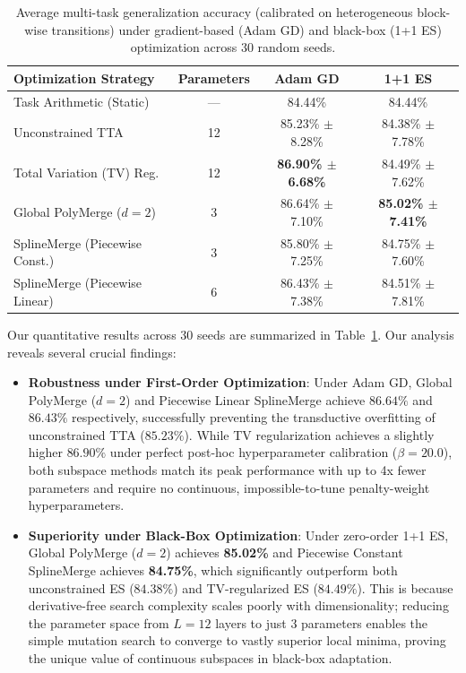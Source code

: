 \begin{table}[t]
\centering
\caption{Average multi-task generalization accuracy (calibrated on heterogeneous block-wise transitions) under gradient-based (Adam GD) and black-box (1+1 ES) optimization across 30 random seeds.}
\label{tab:heterogeneous_results}
\setlength{\tabcolsep}{6pt}
\begin{small}
\begin{tabular}{lccc}
\toprule
\textbf{Optimization Strategy} & \textbf{Parameters} & \textbf{Adam GD} & \textbf{1+1 ES} \\
\midrule
Task Arithmetic (Static) & --- & 84.44\% & 84.44\% \\
Unconstrained TTA & 12 & 85.23\% $\pm$ 8.28\% & 84.38\% $\pm$ 7.78\% \\
Total Variation (TV) Reg. & 12 & \textbf{86.90\% $\pm$ 6.68\%} & 84.49\% $\pm$ 7.62\% \\
\midrule
Global PolyMerge ($d=2$) & 3 & 86.64\% $\pm$ 7.10\% & \textbf{85.02\% $\pm$ 7.41\%} \\
SplineMerge (Piecewise Const.) & 3 & 85.80\% $\pm$ 7.25\% & 84.75\% $\pm$ 7.60\% \\
SplineMerge (Piecewise Linear) & 6 & 86.43\% $\pm$ 7.38\% & 84.51\% $\pm$ 7.81\% \\
\bottomrule
\end{tabular}
\end{small}
\end{table}

Our quantitative results across 30 seeds are summarized in Table~\ref{tab:heterogeneous_results}. Our analysis reveals several crucial findings:
\begin{itemize}
    \item \textbf{Robustness under First-Order Optimization}: Under Adam GD, Global PolyMerge ($d=2$) and Piecewise Linear SplineMerge achieve $86.64\%$ and $86.43\%$ respectively, successfully preventing the transductive overfitting of unconstrained TTA ($85.23\%$). While TV regularization achieves a slightly higher $86.90\%$ under perfect post-hoc hyperparameter calibration ($\beta=20.0$), both subspace methods match its peak performance with up to 4x fewer parameters and require no continuous, impossible-to-tune penalty-weight hyperparameters.
    \item \textbf{Superiority under Black-Box Optimization}: Under zero-order 1+1 ES, Global PolyMerge ($d=2$) achieves \textbf{85.02\%} and Piecewise Constant SplineMerge achieves \textbf{84.75\%}, which significantly outperform both unconstrained ES ($84.38\%$) and TV-regularized ES ($84.49\%$). This is because derivative-free search complexity scales poorly with dimensionality; reducing the parameter space from $L=12$ layers to just $3$ parameters enables the simple mutation search to converge to vastly superior local minima, proving the unique value of continuous subspaces in black-box adaptation.
\end{itemize}

